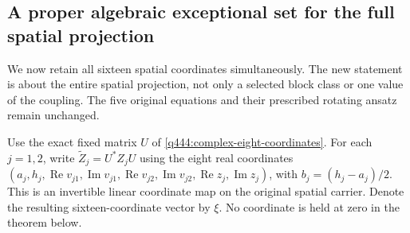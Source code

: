 \subsection{A proper algebraic exceptional set for the full spatial projection}
\label{q444:generic-projection-section}

We now retain all sixteen spatial coordinates simultaneously. The new
statement is about the entire spatial projection, not only a selected
block class or one value of the coupling. The five original equations and
their prescribed rotating ansatz remain unchanged.

Use the exact fixed matrix $U$ of
\eqref{q444:complex-eight-coordinates}. For each $j=1,2$, write
$\widetilde Z_j=U^*Z_jU$ using the eight real coordinates
$(a_j,h_j,\operatorname{Re}v_{j1},\operatorname{Im}v_{j1},
\operatorname{Re}v_{j2},\operatorname{Im}v_{j2},
\operatorname{Re}z_j,\operatorname{Im}z_j)$, with $b_j=(h_j-a_j)/2$.
This is an invertible linear coordinate map on the original spatial
carrier. Denote the resulting sixteen-coordinate vector by $\xi$.
No coordinate is held at zero in the theorem below.

